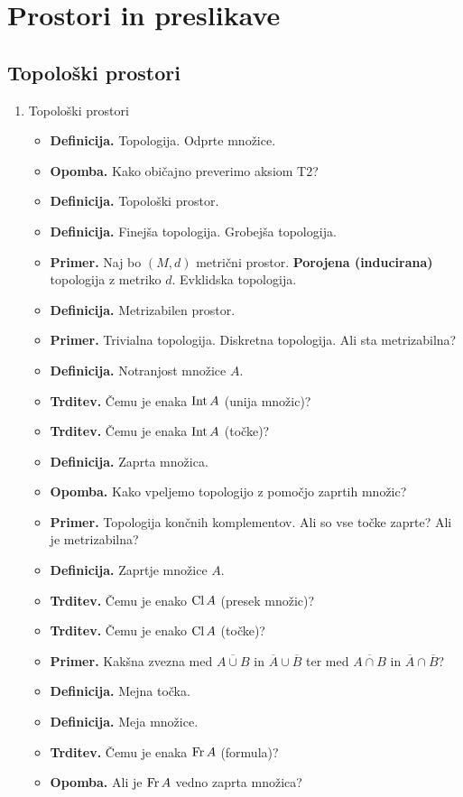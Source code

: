 \section{Prostori in preslikave}

\subsection{Topološki prostori}
\begin{enumerate}
    \item Topološki prostori
    \begin{itemize}
        \item \textbf{Definicija.} Topologija. Odprte množice.
        \item \textbf{Opomba.} Kako običajno preverimo aksiom T2?
        \item \textbf{Definicija.} Topološki prostor.
        \item \textbf{Definicija.} Finejša topologija. Grobejša topologija.         
        \item \textbf{Primer.} Naj bo $(M, d)$ metrični prostor. \textbf{Porojena (inducirana)} topologija z metriko $d$. Evklidska topologija.
        \item \textbf{Definicija.} Metrizabilen prostor.
        \item \textbf{Primer.} Trivialna topologija. Diskretna topologija. Ali sta metrizabilna?
        \item \textbf{Definicija.} Notranjost množice $A$.
        \item \textbf{Trditev.} Čemu je enaka $\operatorname{Int} A$ (unija množic)?
        \item \textbf{Trditev.} Čemu je enaka $\operatorname{Int} A$ (točke)?
        \item \textbf{Definicija.} Zaprta množica.
        \item \textbf{Opomba.} Kako vpeljemo topologijo z pomočjo zaprtih množic?
        \item \textbf{Primer.} Topologija končnih komplementov. Ali so vse točke zaprte? Ali je metrizabilna?
        \item \textbf{Definicija.} Zaprtje množice $A$.
        \item \textbf{Trditev.} Čemu je enako $\operatorname{Cl} A$ (presek množic)?
        \item \textbf{Trditev.} Čemu je enako $\operatorname{Cl} A$ (točke)? 
        \item \textbf{Primer.} Kakšna zvezna med $\overline{A \cup B}$ in $\overline{A} \cup \overline{B}$ ter med $\overline{A \cap B}$ in $\overline{A} \cap \overline{B}$?
        \item \textbf{Definicija.} Mejna točka.
        \item \textbf{Definicija.} Meja množice.
        \item \textbf{Trditev.} Čemu je enaka $\operatorname{Fr} A$ (formula)? 
        \item \textbf{Opomba.} Ali je $\operatorname{Fr} A$ vedno zaprta množica?
    \end{itemize}
\end{enumerate}


